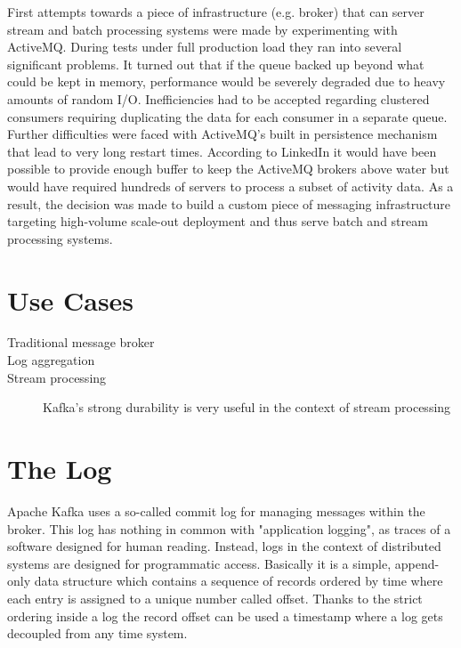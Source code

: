 First attempts towards a piece of infrastructure (e.g. broker) that can server
stream and batch processing systems were made by experimenting with
ActiveMQ\cite{activemq}. During tests under full production load they ran into
several significant problems. It turned out that if the queue backed up beyond what could
be kept in memory, performance would be severely degraded due to heavy amounts of
random I/O. Inefficiencies had to be accepted regarding clustered consumers
requiring duplicating the data for each consumer in a separate queue. Further
difficulties were faced with ActiveMQ's built in persistence mechanism that lead
to very long restart times. 
According to LinkedIn it would have been possible to provide enough buffer to
keep the ActiveMQ brokers above water but would have required hundreds of servers to
process a subset of activity data. As a result, the decision was made to build a
custom piece of messaging infrastructure targeting high-volume scale-out
deployment and thus serve batch and stream processing systems. 
\cite{goodhope2012building}

\section{Use Cases}
\begin{description}
    \item [Traditional message broker]
    \item [Log aggregation]
    \item [Stream processing] Kafka's strong durability is very useful in the
        context of stream processing
\end{description}
\section{The Log}
\label{intro-kafka-log}
Apache Kafka uses a so-called commit log for managing messages within the
broker. This log has nothing in common with "application logging", as traces of
a software designed for human reading. Instead, logs in the context of distributed systems
are designed for programmatic access. Basically it is a simple, append-only data
structure which contains a sequence of records ordered by time where each
entry is assigned to a unique number called offset. Thanks to the strict
ordering inside a log the record offset can be used a timestamp where a log
gets decoupled from any time system. \cite{apachekafka} \cite{JK-TheLog}

